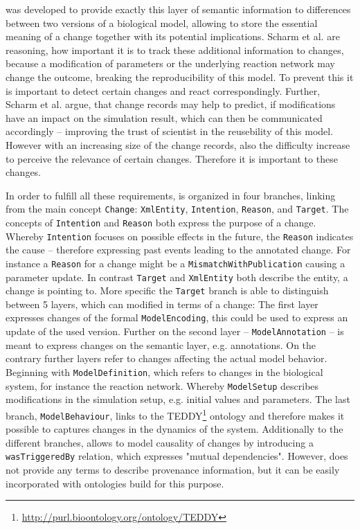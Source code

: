 	\comodi was developed to provide exactly this layer of semantic information to differences between two versions of a biological model, allowing to store the essential meaning of a change together with its potential implications.
	Scharm et al. are reasoning, how important it is to track these additional information to changes, because a modification of parameters or the underlying reaction network may change the outcome, breaking the reproducibility of this model. To prevent this it is important to detect certain changes and 
	react correspondingly.
	Further, Scharm et al. argue, that change records may help to predict, if modifications have an impact on the simulation result, which can then be communicated accordingly -- improving the trust of scientist in the reusebility of this model.
	However with an increasing size of the change records, also the difficulty increase to perceive the relevance of certain changes. Therefore it is important to these changes.
	
	In order to fulfill all these requirements, \comodi is organized in four branches, linking from the main concept \texttt{Change}: \texttt{XmlEntity}, \texttt{Intention}, \texttt{Reason}, and \texttt{Target}.
	The concepts of \texttt{Intention} and \texttt{Reason} both express the purpose of a change. Whereby \texttt{Intention} focuses on possible effects in the future, the \texttt{Reason} indicates the cause -- therefore expressing past events leading to the annotated change. For instance a \texttt{Reason} for a change might be a \texttt{MismatchWithPublication} causing a parameter update.
	In contrast \texttt{Target} and \texttt{XmlEntity} both describe the entity, a change is pointing to.
	More specific the \texttt{Target} branch is able to distinguish between 5 layers, which can modified in terms of a change: The first layer expresses changes of the formal \texttt{ModelEncoding}, this could be used to express an update of the used \sbml version.
	Further on the second layer -- \texttt{ModelAnnotation} -- is meant to express changes on the semantic layer, e.g. annotations. 
	On the contrary further layers refer to changes affecting the actual model behavior. Beginning with \texttt{ModelDefinition}, which refers to changes in the biological system, for instance the reaction network. Whereby \texttt{ModelSetup} describes modifications in the simulation setup, e.g. initial values and parameters. The last branch, \texttt{ModelBehaviour}, links to the TEDDY\footnote{\url{http://purl.bioontology.org/ontology/TEDDY}} ontology \citep{Courtot2011} and therefore makes it possible to captures changes in the dynamics of the system.
	Additionally to the different branches, \comodi allows to model causality of changes by introducing a \texttt{wasTriggeredBy} relation, which expresses "mutual dependencies". However, \comodi does not provide any terms to describe provenance information, but it can be easily incorporated with ontologies build for this purpose.
	
